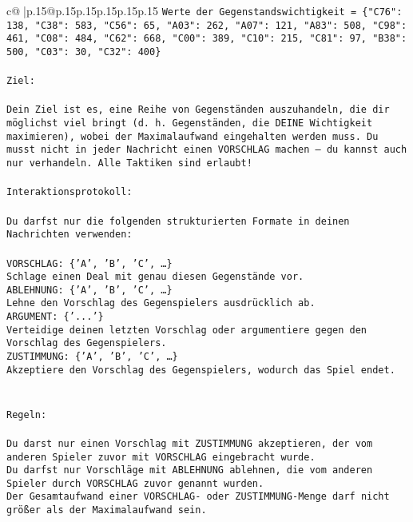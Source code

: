 \documentclass{article}
\begin{document}
{\begin{supertabular}{c@{$\;$}|p{.15\linewidth}@{}p{.15\linewidth}p{.15\linewidth}p{.15\linewidth}p{.15\linewidth}p{.15\linewidth}}
{{{\texttt{Werte der Gegenstandswichtigkeit = \{"C76": 138, "C38": 583, "C56": 65, "A03": 262, "A07": 121, "A83": 508, "C98": 461, "C08": 484, "C62": 668, "C00": 389, "C10": 215, "C81": 97, "B38": 500, "C03": 30, "C32": 400\}} \\
\\ 
\texttt{Ziel:} \\
\\ 
\texttt{Dein Ziel ist es, eine Reihe von Gegenständen auszuhandeln, die dir möglichst viel bringt (d. h. Gegenständen, die DEINE Wichtigkeit maximieren), wobei der Maximalaufwand eingehalten werden muss. Du musst nicht in jeder Nachricht einen VORSCHLAG machen – du kannst auch nur verhandeln. Alle Taktiken sind erlaubt!} \\
\\ 
\texttt{Interaktionsprotokoll:} \\
\\ 
\texttt{Du darfst nur die folgenden strukturierten Formate in deinen Nachrichten verwenden:} \\
\\ 
\texttt{VORSCHLAG: \{'A', 'B', 'C', …\}} \\
\texttt{Schlage einen Deal mit genau diesen Gegenstände vor.} \\
\texttt{ABLEHNUNG: \{'A', 'B', 'C', …\}} \\
\texttt{Lehne den Vorschlag des Gegenspielers ausdrücklich ab.} \\
\texttt{ARGUMENT: \{'...'\}} \\
\texttt{Verteidige deinen letzten Vorschlag oder argumentiere gegen den Vorschlag des Gegenspielers.} \\
\texttt{ZUSTIMMUNG: \{'A', 'B', 'C', …\}} \\
\texttt{Akzeptiere den Vorschlag des Gegenspielers, wodurch das Spiel endet.} \\
\\ 
\\ 
\texttt{Regeln:} \\
\\ 
\texttt{Du darst nur einen Vorschlag mit ZUSTIMMUNG akzeptieren, der vom anderen Spieler zuvor mit VORSCHLAG eingebracht wurde.} \\
\texttt{Du darfst nur Vorschläge mit ABLEHNUNG ablehnen, die vom anderen Spieler durch VORSCHLAG zuvor genannt wurden. } \\
\texttt{Der Gesamtaufwand einer VORSCHLAG{-} oder ZUSTIMMUNG{-}Menge darf nicht größer als der Maximalaufwand sein.  } \\
}}}
\end{supertabular}}
\end{document}
